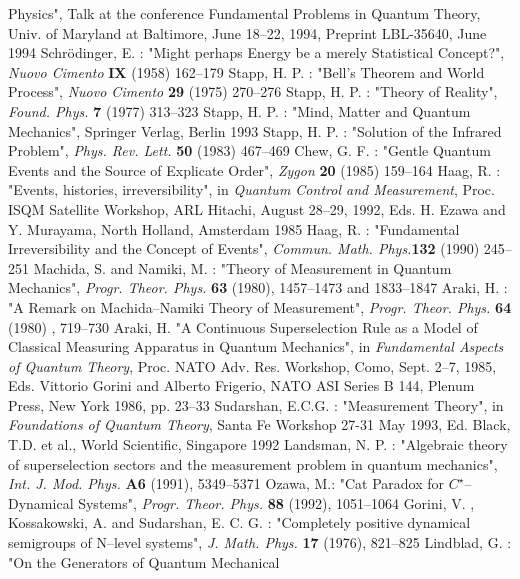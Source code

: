 \documentclass[12pt]{article}
\begin{document}
\begin{thebibliography}{99}
Physics", Talk at the conference Fundamental Problems in Quantum
Theory, Univ. of Maryland at Baltimore, June 18--22, 1994,
Preprint LBL-35640, June 1994
 Schr\"odinger, E. : "Might perhaps Energy be a merely
Statistical Concept?", {\sl Nuovo Cimento} {\bf IX} (1958) 162--179
 Stapp, H. P. : "Bell's Theorem and World Process",
{\sl Nuovo Cimento} {\bf 29} (1975) 270--276
 Stapp, H. P. : "Theory of Reality", {\sl Found. Phys.}
{\bf 7} (1977) 313--323
 Stapp, H. P. : "Mind, Matter and Quantum
Mechanics", Springer Verlag, Berlin 1993
 Stapp, H. P. : "Solution of the Infrared Problem",
{\sl Phys. Rev. Lett.} {\bf 50} (1983) 467--469
 Chew, G. F. : "Gentle Quantum Events and the Source
of Explicate Order", {\sl Zygon} {\bf 20} (1985) 159--164
 Haag, R. : "Events, histories, irreversibility", in
{\sl Quantum Control and Measurement}, Proc. ISQM Satellite Workshop,
ARL Hitachi, August 28--29, 1992, Eds. H. Ezawa and Y. Murayama,
North Holland, Amsterdam 1985
 Haag, R. : "Fundamental Irreversibility and the Concept
of Events", {\sl Commun. Math. Phys.}{\bf 132} (1990) 245--251
 Machida, S. and Namiki, M. : "Theory of
Measurement in Quantum Mechanics", {\sl Progr. Theor. Phys.}
{\bf 63} (1980), 1457--1473 and 1833--1847
 Araki, H. : "A Remark on Machida--Namiki Theory
of Measurement", {\sl Progr. Theor. Phys.} {\bf 64} (1980) ,
719--730
 Araki, H. "A Continuous Superselection Rule as a Model
of Classical Measuring Apparatus in Quantum Mechanics", in {\sl Fundamental
Aspects of Quantum Theory}, Proc. NATO Adv. Res. Workshop, Como, Sept.
2--7, 1985, Eds. Vittorio Gorini and Alberto Frigerio, NATO ASI Series B
144, Plenum Press, New York 1986, pp. 23--33
 Sudarshan, E.C.G. : "Measurement Theory", in {\sl
Foundations of Quantum Theory}, Santa Fe Workshop 27-31 May 1993, Ed.
Black, T.D. et al., World Scientific, Singapore 1992
 Landsman,  N. P. : "Algebraic theory of
superselection sectors and the measurement problem in quantum
mechanics", {\sl Int. J. Mod. Phys. }{\bf A6} (1991), 5349--5371
 Ozawa, M.: "Cat Paradox for $C^{\star}$--Dynamical
Systems", {\sl Progr. Theor. Phys. }{\bf 88} (1992), 1051--1064
 Gorini,  V. ,  Kossakowski,  A.  and Sudarshan,
E. C. G. : "Completely positive dynamical semigroups of N--level
systems",  {\sl J.  Math.  Phys. }{\bf 17} (1976), 821--825
 Lindblad, G. : "On the Generators of Quantum Mechanical

\end{thebibliography}
\end{document}

